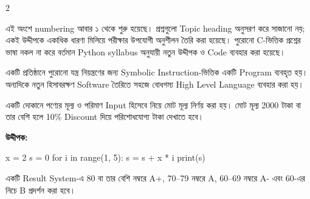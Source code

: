{\begin{multicols}{2}
\begin{rememberbox}
এই অংশে numbering আবার ১ থেকে শুরু হয়েছে। প্রশ্নগুলো Topic heading অনুসরণ করে সাজানো নয়;
একই উদ্দীপকে একাধিক ধারণা মিলিয়ে পরীক্ষার উপযোগী অনুশীলন তৈরি করা হয়েছে।
পুরোনো C-ভিত্তিক প্রশ্নের ভাষা নকল না করে বর্তমান Python syllabus অনুযায়ী নতুন উদ্দীপক ও Code ব্যবহার করা হয়েছে।
\end{rememberbox}

\begin{stimulusbox}
একটি প্রতিষ্ঠানে পুরোনো যন্ত্র নিয়ন্ত্রণের জন্য Symbolic Instruction-ভিত্তিক একটি Program ব্যবহৃত হয়।
অন্যদিকে নতুন হিসাবরক্ষণ Software তৈরিতে সহজে বোধগম্য High Level Language ব্যবহার করা হয়।
\end{stimulusbox}

\begin{stimulusbox}
একটি দোকানে পণ্যের মূল্য ও পরিমাণ Input হিসেবে নিয়ে মোট মূল্য নির্ণয় করা হয়। মোট মূল্য 2000 টাকা বা তার বেশি হলে 10\% Discount দিয়ে পরিশোধযোগ্য টাকা দেখাতে হবে।
\end{stimulusbox}

\textbf{উদ্দীপক:}
\begin{pythoncode}
x = 2
s = 0
for i in range(1, 5):
    s = s + x * i
print(s)
\end{pythoncode}

\begin{stimulusbox}
একটি Result System-এ 80 বা তার বেশি নম্বরে A+, 70--79 নম্বরে A, 60--69 নম্বরে A- এবং 60-এর নিচে B প্রদর্শন করা হবে।
\end{stimulusbox}


\end{multicols}}
